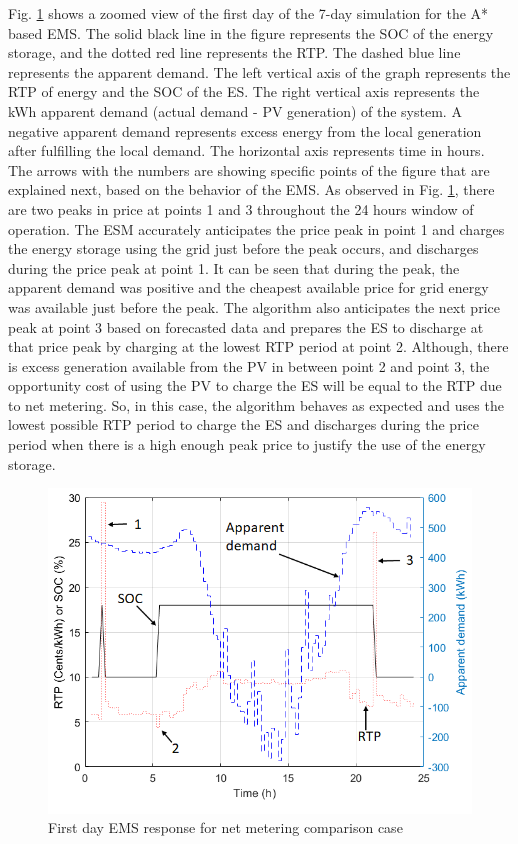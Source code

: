 Fig. \ref{fig:SBMPO_COMP_1_day} shows a zoomed view of the first day of the 7-day simulation for the A* based EMS. The solid black line in the figure represents the SOC of the energy storage, and the dotted red line represents the RTP. The dashed blue line represents the apparent demand. The left vertical axis of the graph represents the RTP of energy and the SOC of the ES. The right vertical axis represents the kWh apparent demand (actual demand - PV generation) of the system. A negative apparent demand represents excess energy from the local generation after fulfilling the local demand. The horizontal axis represents time in hours. The arrows with the numbers are showing specific points of the figure that are explained next, based on the behavior of the EMS. As observed in Fig. \ref{fig:SBMPO_COMP_1_day}, there are two peaks in price at points 1 and 3 throughout the 24 hours window of operation. The ESM accurately anticipates the price peak in point 1 and charges the energy storage using the grid just before the peak occurs, and discharges during the price peak at point 1. It can be seen that during the peak, the apparent demand was positive and the cheapest available price for grid energy was available just before the peak. The algorithm also anticipates the next price peak at point 3 based on forecasted data and prepares the ES to discharge at that price peak by charging at the lowest RTP period at point 2. Although, there is excess generation available from the PV in between point 2 and point 3, the opportunity cost of using the PV to charge the ES will be equal to the RTP due to net metering. So, in this case, the algorithm behaves as expected and uses the lowest possible RTP period to charge the ES and discharges during the price period when there is a high enough peak price to justify the use of the energy storage.
\begin{figure}[!ht]
    \centering
    \includegraphics[width = \linewidth]{figs/SBMPO_COMP_1_day.png}
    \caption{First day EMS response for net metering comparison case}
    \label{fig:SBMPO_COMP_1_day}
\end{figure}
